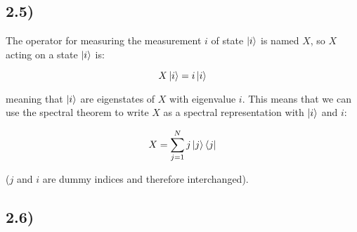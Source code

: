 \documentclass[a4paper,norsk, 10pt]{article}
\begin{document}
\subsection{2.5)}

The operator for measuring the measurement $i$ of state $\ket{i}$ is named $X$, so $X$ acting on a state $\ket{i}$ is:

\begin{equation}
X\ket{i} = i\ket{i}
\end{equation}

meaning that $\ket{i}$ are eigenstates of $X$ with eigenvalue $i$. This means that we can use the spectral theorem to write $X$ as a spectral representation with $\ket{i}$ and $i$:

\begin{equation}
X = \sum_{j=1}^N j\ket{j}\bra{j}
\end{equation}

($j$ and $i$ are dummy indices and therefore interchanged).

\subsection{2.6)}
\end{document}
